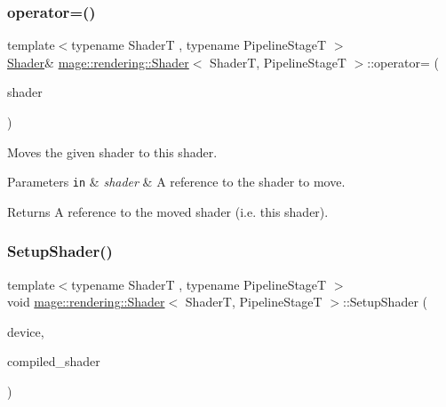 \subsubsection{\texorpdfstring{operator=()}{operator=()}\hspace{0.1cm}{\footnotesize\ttfamily [2/2]}}
{\footnotesize\ttfamily template$<$typename ShaderT , typename Pipeline\+StageT $>$ \\
\mbox{\hyperlink{classmage_1_1rendering_1_1_shader}{Shader}}\& \mbox{\hyperlink{classmage_1_1rendering_1_1_shader}{mage\+::rendering\+::\+Shader}}$<$ ShaderT, Pipeline\+StageT $>$\+::operator= (\begin{DoxyParamCaption}\item[{\mbox{\hyperlink{classmage_1_1rendering_1_1_shader}{Shader}}$<$ ShaderT, Pipeline\+StageT $>$ \&\&}]{shader }\end{DoxyParamCaption})\hspace{0.3cm}{\ttfamily [noexcept]}}

Moves the given shader to this shader.


\begin{DoxyParams}[1]{Parameters}
\mbox{\tt in}  & {\em shader} & A reference to the shader to move. \\
\hline
\end{DoxyParams}
\begin{DoxyReturn}{Returns}
A reference to the moved shader (i.\+e. this shader). 
\end{DoxyReturn}
\mbox{\label{classmage_1_1rendering_1_1_shader_ad8b71024d802eb02d9017d767da995d8}} 
\subsubsection{\texorpdfstring{Setup\+Shader()}{SetupShader()}}
{\footnotesize\ttfamily template$<$typename ShaderT , typename Pipeline\+StageT $>$ \\
void \mbox{\hyperlink{classmage_1_1rendering_1_1_shader}{mage\+::rendering\+::\+Shader}}$<$ ShaderT, Pipeline\+StageT $>$\+::Setup\+Shader (\begin{DoxyParamCaption}\item[{I\+D3\+D11\+Device \&}]{device,  }\item[{const \mbox{\hyperlink{classmage_1_1rendering_1_1_compiled_shader}{Compiled\+Shader}}$<$ ShaderT, Pipeline\+StageT $>$ \&}]{compiled\+\_\+shader }\end{DoxyParamCaption})\hspace{0.3cm}{\ttfamily [private]}}

